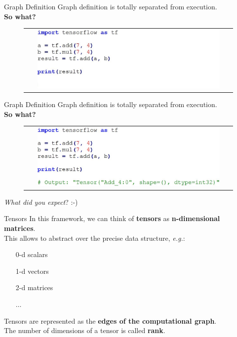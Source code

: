 \documentclass[aspectratio=169]{beamer}
\begin{document}
\begin{frame}{Graph Definition}
Graph definition is totally separated from execution.\\
\textbf{So what?}
\begin{figure}
\begin{tabular}{c}
	\includegraphics[width=0.9\textwidth]{img/tf/graph_definition_0.jpg}
\end{tabular}
\end{figure}
\end{frame}


\begin{frame}{Graph Definition}
Graph definition is totally separated from execution.\\
\textbf{So what?}
\begin{figure}
\begin{tabular}{c}
	\includegraphics[width=0.9\textwidth]{img/tf/graph_definition_1.jpg}
\end{tabular}
\end{figure}
\textit{What did you expect}? :-)
\end{frame}


\begin{frame}{Tensors}
In this framework, we can think of \textbf{tensors} as \textbf{n-dimensional matrices}.\\
\vspace{0.25cm}
This allows to abstract over the precise data structure, \textit{e.g.}:
\begin{itemize}
\item[0-d] scalars
\item[1-d] vectors
\item[2-d] matrices
\item[] $\dots$
\end{itemize}
Tensors are represented as the \textbf{edges of the computational graph}.\\
The number of dimensions of a tensor is called \textbf{rank}.
\end{frame}
\end{document}
